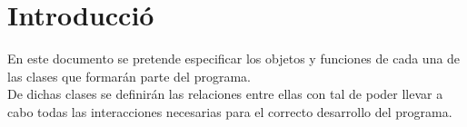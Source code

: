 \section{Introducció}\label{sec:intro}

\begin{flushleft}
En este documento se pretende especificar los objetos y funciones de cada una de las clases que formarán parte del programa.\\

De dichas clases se definirán las relaciones entre ellas con tal de poder llevar a cabo todas las interacciones necesarias para el correcto desarrollo del programa.\\
\end{flushleft}
